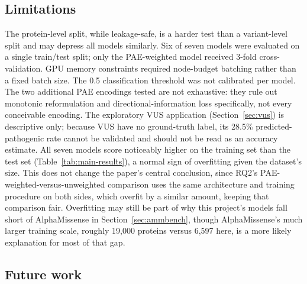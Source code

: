 \documentclass[10pt,conference,a4paper]{IEEEtran}
\begin{document}
\subsection{Limitations}

The protein-level split, while leakage-safe, is a harder test than a variant-level split and may depress all models similarly. Six of seven models were evaluated on a single train/test split; only the PAE-weighted model received 3-fold cross-validation. GPU memory constraints required node-budget batching rather than a fixed batch size. The 0.5 classification threshold was not calibrated per model. The two additional PAE encodings tested are not exhaustive: they rule out monotonic reformulation and directional-information loss specifically, not every conceivable encoding. The exploratory VUS application (Section~\ref{sec:vus}) is descriptive only; because VUS have no ground-truth label, its 28.5\% predicted-pathogenic rate cannot be validated and should not be read as an accuracy estimate. All seven models score noticeably higher on the training set than the test set (Table~\ref{tab:main-results}), a normal sign of overfitting given the dataset's size. This does not change the paper's central conclusion, since RQ2's PAE-weighted-versus-unweighted comparison uses the same architecture and training procedure on both sides, which overfit by a similar amount, keeping that comparison fair. Overfitting may still be part of why this project's models fall short of AlphaMissense in Section~\ref{sec:ammbench}, though AlphaMissense's much larger training scale, roughly 19{,}000 proteins versus 6{,}597 here, is a more likely explanation for most of that gap.

\subsection{Future work}
\end{document}

